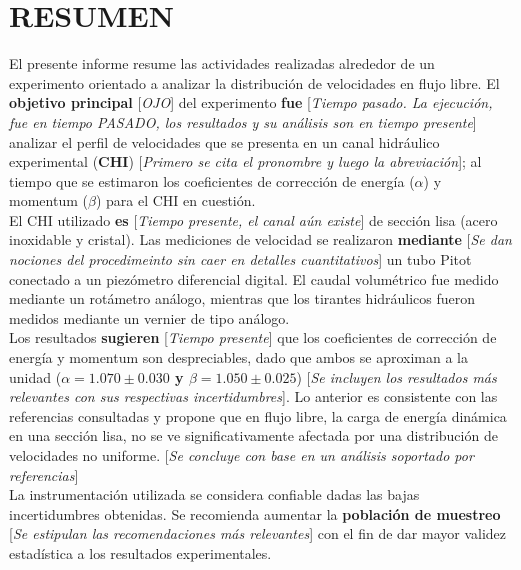 \documentclass[11pt, letterpaper]{article}
\begin{document}
\pagebreak


\section{RESUMEN} 

El presente informe resume las actividades realizadas alrededor de un experimento orientado a analizar la distribución de velocidades en flujo libre. El \textbf{objetivo principal} [\emph{OJO}] del experimento \textbf{fue} [\emph{Tiempo pasado. La ejecución, fue en tiempo PASADO, los resultados y su análisis son en tiempo presente}] analizar el perfil de velocidades que se presenta en un canal hidráulico experimental (\textbf{CHI}) [\emph{Primero se cita el pronombre y luego la abreviación}]; al tiempo que se estimaron los coeficientes de corrección de energía ($\alpha$) y momentum ($\beta$) para el CHI en cuestión.\\
El CHI utilizado \textbf{es} [\emph{Tiempo presente, el canal aún existe}] de sección lisa (acero inoxidable y cristal). Las mediciones de velocidad se realizaron \textbf{mediante} [\emph{Se dan nociones del procedimeinto sin caer en detalles cuantitativos}] un tubo Pitot conectado a un piezómetro diferencial digital. El caudal volumétrico fue medido mediante un rotámetro análogo, mientras que los tirantes hidráulicos fueron medidos mediante un vernier de tipo análogo.\\
Los resultados \textbf{sugieren} [\emph{Tiempo presente}] que los coeficientes de corrección de energía y momentum son despreciables, dado que ambos se aproximan a la unidad (\textbf{$\alpha = 1.070 \pm 0.030$ y $\beta = 1.050 \pm 0.025$}) [\emph{Se incluyen los resultados más relevantes con sus respectivas incertidumbres}]. Lo anterior es consistente con las referencias consultadas y propone que en flujo libre, la carga de energía dinámica en una sección lisa, no se ve significativamente afectada por una distribución de velocidades no uniforme. [\emph{Se concluye con base en un análisis soportado por referencias}] \\
La instrumentación utilizada se considera confiable dadas las bajas incertidumbres obtenidas. Se recomienda aumentar la \textbf{población de muestreo} [\emph{Se estipulan las recomendaciones más relevantes}] con el fin de dar mayor validez estadística a los resultados experimentales.\\
\end{document}
